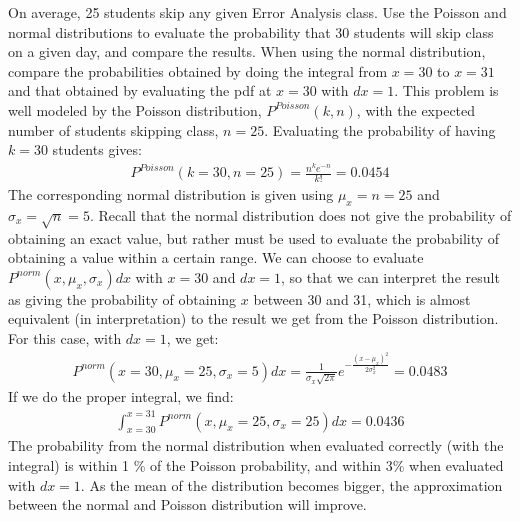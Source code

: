 \begin{example}{On average, 25 students skip any given Error Analysis class. Use the Poisson and normal distributions to evaluate the probability that 30 students will skip class on a given day, and compare the results. When using the normal distribution, compare the probabilities obtained by doing the integral from $x=30$ to $x=31$ and that obtained by evaluating the pdf at $x=30$ with $dx=1$.}
This problem is well modeled by the Poisson distribution, $P^{Poisson}(k,n)$, with the expected number of students skipping class, $n=25$. Evaluating the probability of having $k=30$ students gives:
\begin{align*}
P^{Poisson}(k=30,n=25)=\frac{n^k e^{-n}}{k!} =0.0454
\end{align*}
The corresponding normal distribution is given using $\mu_x=n=25$ and $\sigma_x=\sqrt{n}=5$. Recall that the normal distribution does not give the probability of obtaining an exact value, but rather must be used to evaluate the probability of obtaining a value within a certain range. We can choose to evaluate $P^{norm}(x,\mu_x,\sigma_x)dx$ with $x=30$ and $dx=1$, so that we can interpret the result as giving the probability of obtaining $x$ between 30 and 31, which is almost equivalent (in interpretation) to the result we get from the Poisson distribution. For this case, with $dx=1$, we get:
\begin{align*}
P^{norm}(x=30,\mu_x=25,\sigma_x=5)dx=\frac{1}{\sigma_x\sqrt{2\pi}}e^{-\frac{(x-\mu_x)^2}{2\sigma_x^2}}=0.0483
\end{align*}
If we do the proper integral, we find:
\begin{align*}
\int_{x=30}^{x=31}P^{norm}(x,\mu_x=25,\sigma_x=25)dx=0.0436
\end{align*}
The probability from the normal distribution when evaluated correctly (with the integral) is within 1 \% of the Poisson probability, and within 3\% when evaluated with $dx=1$. As the mean of the distribution becomes bigger, the approximation between the normal and Poisson distribution will improve.


\end{example}
